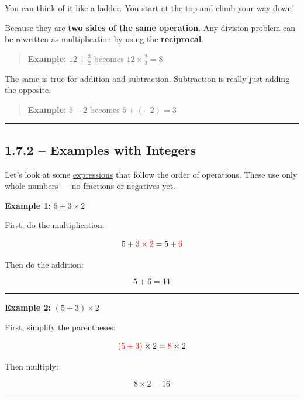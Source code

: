 \documentclass[
  letterpaper,
  DIV=11,
  numbers=noendperiod]{scrreprt}
\begin{document}
You can think of it like a ladder. You start at the top and climb your
way down!

Because they are \textbf{two sides of the same operation}. Any division
problem can be rewritten as multiplication by using the
\textbf{reciprocal}.

\begin{quote}
\textbf{Example:} \(12 \div \frac{3}{2}\) becomes
\(12 \times \frac{2}{3} = 8\)
\end{quote}

The same is true for addition and subtraction. Subtraction is really
just adding the opposite.

\begin{quote}
\textbf{Example:} \(5 - 2\) becomes \(5 + (-2) = 3\)
\end{quote}

\begin{center}\rule{0.5\linewidth}{0.5pt}\end{center}

\subsection*{1.7.2 -- Examples with
Integers}\label{examples-with-integers}

Let's look at some
\href{./glossary.html\#glossary-expression}{expressions} that follow the
order of operations. These use only whole numbers --- no fractions or
negatives yet.

\textbf{Example 1:} \(5 + 3 \times 2\)

First, do the multiplication:

\[
5 + \color{red}3 \times 2 \color{black} = 5 + \color{red}6
\]

Then do the addition:

\[
5 + 6 = 11
\]

\begin{center}\rule{0.5\linewidth}{0.5pt}\end{center}

\textbf{Example 2:} \((5 + 3) \times 2\)

First, simplify the parentheses:

\[
\color{red}(5 + 3) \color{black} \times 2 = \color{red}8 \color{black} \times 2
\]

Then multiply:

\[
8 \times 2 = 16
\]

\begin{center}\rule{0.5\linewidth}{0.5pt}\end{center}
\end{document}
